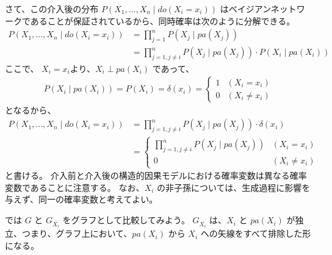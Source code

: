 \documentclass[uplatex, dvipdfmx]{jsarticle}
\begin{document}
さて、この介入後の分布 $P(X_1, \dots, X_n \mid do(X_i = x_i))$ はベイジアンネットワークであることが保証されているから、同時確率は次のように分解できる。
\begin{align*}
  P(X_1, \dots, X_n \mid do(X_i = x_i)) &= \prod_{j=1}^n P(X_j \mid pa(X_j)) \\
  &= \prod_{j=1, j \neq i}^n P(X_j \mid pa(X_j)) \cdot P(X_i \mid pa(X_i))
\end{align*}
ここで、
$X_i = x_i$より、$X_i \perp pa(X_i)$ であって、
\begin{align}
  P(X_i \mid pa(X_i)) = P(X_i) = \delta(x_i) = 
  \begin{cases} 
    1 & (X_i = x_i) \\ 
    0 & (X_i \neq x_i) 
  \end{cases}
\end{align}
となるから、
\begin{align}
  P(X_1, \dots, X_n \mid do(X_i = x_i)) &= \prod_{j=1, j \neq i}^n P(X_j \mid pa(X_j)) \cdot \delta(x_i) \\
  &= 
  \begin{cases} 
    \prod_{j=1, j \neq i}^n P(X_j \mid pa(X_j)) & (X_i = x_i) \\ 
    0 & (X_i \neq x_i) 
  \end{cases}
\end{align}
と書ける。
介入前と介入後の構造的因果モデルにおける確率変数は異なる確率変数であることに注意する。
なお、$X_i$ の非子孫については、生成過程に影響を与えず、同一の確率変数と考えてよい。

では $G$ と $G_{\overline{X_i}}$ をグラフとして比較してみよう。
$G_{\overline{X_i}}$ は、$X_i$ と $pa(X_i)$ が独立、つまり、グラフ上において、$pa(X_i)$ から $X_i$ への矢線をすべて排除した形になる。
\end{document}
